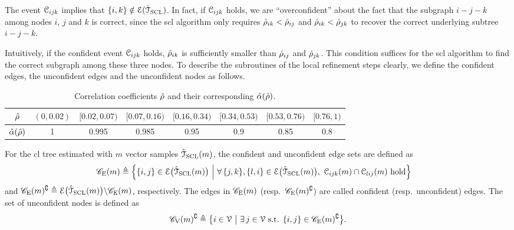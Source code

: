 \begin{remark}
	The event $\mathcal{C}_{ijk}$ implies that $\{i,k\}\notin\mathcal{E}(\hat{\mathcal{T}}_{\rm{SCL}})$. In fact, if $\mathcal{C}_{ijk}$ holds, we are ``overconfident'' about the fact  that the subgraph $i-j-k$ among nodes $i$, $j$ and $k$ is correct, since the \ac{scl} algorithm only requires $\hat{\rho}_{ik}< \hat{\rho}_{ij}$ and $\hat{\rho}_{ik}< \hat{\rho}_{jk}$ to recover the correct underlying subtree $i-j-k$.
\end{remark}
Intuitively, if the confident event $\mathcal{C}_{ijk}$ holds, $\hat{\rho}_{ik}$ is sufficiently smaller than $\hat{\rho}_{ij}$ and $\hat{\rho}_{jk}$. This condition suffices  for the \ac{scl} algorithm to find the correct subgraph among these three nodes. To describe the subroutines of the local refinement steps clearly, we define the confident edges, the unconfident edges and the unconfident nodes as follows.
\begin{table}[H]
	\normalsize
	\centering
	\begin{tabular}{|c|c|c|c|c|c|c|c|}
	\hline
	$\hat{\rho}$ & $(0,0.02)$ & $[0.02,0.07)$ & $[0.07,0.16)$ & $[0.16,0.34)$ & $[0.34,0.53)$ & $[0.53,0.76)$ & $[0.76,1)$\\
	\hline
	$\hat{\alpha}(\hat{\rho})$ & 1 & 0.995 & 0.985 & 0.95 & 0.9 & 0.85 & 0.8 \\
	\hline
	\end{tabular}
	\caption{Correlation coefficients $\hat{\rho}$ and their corresponding $\hat{\alpha}(\hat{\rho})$.}
	\label{table:alpha}
\end{table}
\begin{definition}\label{def:confide}
	For the \ac{cl} tree estimated with $m$ vector samples $\hat{\mathcal{T}}_{\rm{SCL}}(m)$, the confident and unconfident edge sets are defined as
	\begin{align}
		\mathscr{C}_{\mathrm{E}}(m)&\triangleq \Big\{\{i,j\}\in\mathcal{E}\big(\hat{\mathcal{T}}_{\rm{SCL}}(m)\big) ~\Big|~\forall\, \{j,k\},\{l,i\}\in\mathcal{E}\big(\hat{\mathcal{T}}_{\rm{SCL}}(m)\big),~\mathcal{C}_{ijk}(m) \cap\mathcal{C}_{lij}(m) \text{ hold}\Big\}
		\end{align}
		and $\mathscr{C}_{\mathrm{E}}(m)^{\complement} \triangleq \mathcal{E}\big(\hat{\mathcal{T}}_{\rm{SCL}}(m)\big)\backslash \mathscr{C}_{\mathrm{E}}(m)$,
	respectively. The edges in $\mathscr{C}_{\mathrm{E}}(m)$ (resp.\ $\mathscr{C}_{\mathrm{E}}(m)^{\complement}$) are called confident (resp.\ unconfident) edges. The set of unconfident nodes  is defined as
	\begin{align}
		\scC_{\mathrm{V}}(m)^{\complement}\triangleq \big\{i\in\calV \ \big| \ \exists\,  j\in\calV \text{ s.t. }\{i,j\}\in \scC_{\mathrm{E}}(m)^{\complement} \big\}.\nonumber
	\end{align}
\end{definition}

